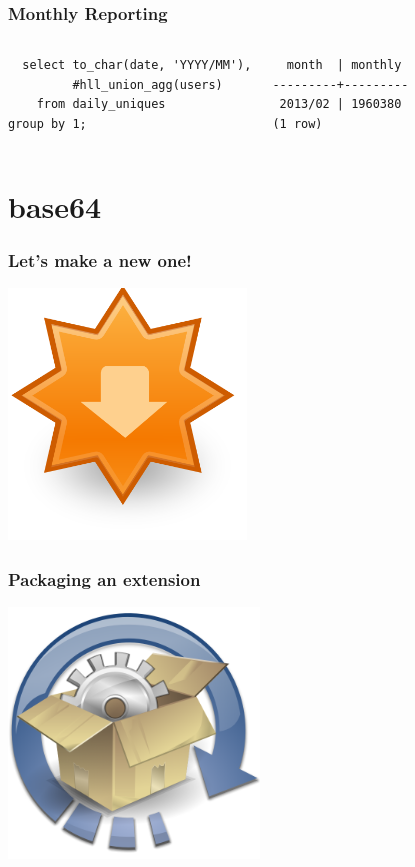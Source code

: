 \documentclass{beamer}
\begin{document}
\begin{frame}[fragile]
  \frametitle{Monthly Reporting}

\begin{columns}
\begin{verbatim}
  select to_char(date, 'YYYY/MM'),
         #hll_union_agg(users)
    from daily_uniques
group by 1;
\end{verbatim}  
\begin{verbatim}     
  month  | monthly 
---------+---------
 2013/02 | 1960380
(1 row)
\end{verbatim}  
\end{columns}
\end{frame}

\section{base64}

\begin{frame}[fragile]
  \frametitle{Let's make a new one!}

\begin{center}
  \includegraphics[height=18em]{extension-update.png}
\end{center}
\end{frame}

\begin{frame}[fragile]
  \frametitle{Packaging an extension}

\begin{center}
  \includegraphics[height=18em]{software-upgrade.png}
\end{center}
\end{frame}
\end{document}
